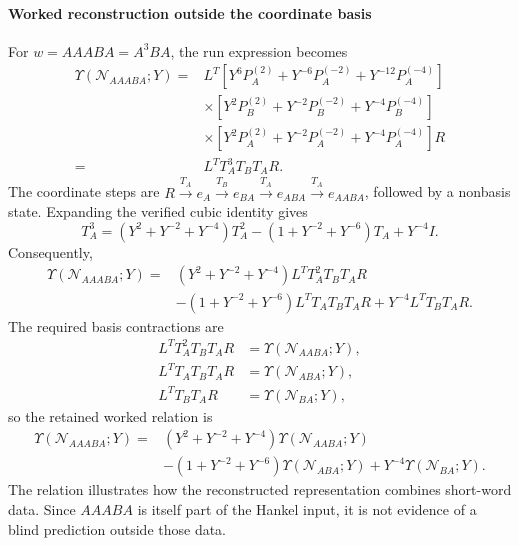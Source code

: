 \documentclass[10pt,twocolumn]{article}
\begin{document}
\paragraph{Worked reconstruction outside the coordinate basis}
\label{supp:nonabelian_worked_example}
For $w=AAABA=A^3BA$, the run expression becomes
\begin{equation}
\begin{aligned}
\Upsilon(\mathcal N_{AAABA};Y)={}&L^T\left[Y^6P_A^{(2)}+Y^{-6}P_A^{(-2)}+Y^{-12}P_A^{(-4)}\right]\\
&\times\left[Y^2P_B^{(2)}+Y^{-2}P_B^{(-2)}+Y^{-4}P_B^{(-4)}\right]\\
&\times\left[Y^2P_A^{(2)}+Y^{-2}P_A^{(-2)}+Y^{-4}P_A^{(-4)}\right]R\\
={}&L^TT_A^3T_BT_AR.
\end{aligned}
\label{supp:deriv:eq:AAABA_projector_prediction}
\end{equation}
The coordinate steps are $R\xrightarrow{T_A}e_A\xrightarrow{T_B}e_{BA}\xrightarrow{T_A}e_{ABA}\xrightarrow{T_A}e_{AABA}$, followed by a nonbasis state. Expanding the verified cubic identity gives
\begin{equation}
T_A^3=(Y^2+Y^{-2}+Y^{-4})T_A^2-(1+Y^{-2}+Y^{-6})T_A+Y^{-4}I.
\label{supp:deriv:eq:TA3_reduction}
\end{equation}
Consequently,
\begin{equation}
\begin{aligned}
\Upsilon(\mathcal N_{AAABA};Y)={}&(Y^2+Y^{-2}+Y^{-4})L^TT_A^2T_BT_AR\\
&-(1+Y^{-2}+Y^{-6})L^TT_AT_BT_AR+Y^{-4}L^TT_BT_AR.
\end{aligned}
\label{supp:deriv:eq:AAABA_reduced}
\end{equation}
The required basis contractions are
\begin{equation}
\begin{aligned}
L^TT_A^2T_BT_AR&=\Upsilon(\mathcal N_{AABA};Y),\\
L^TT_AT_BT_AR&=\Upsilon(\mathcal N_{ABA};Y),\\
L^TT_BT_AR&=\Upsilon(\mathcal N_{BA};Y),
\end{aligned}
\label{supp:deriv:eq:AAABA_basis_contractions}
\end{equation}
so the retained worked relation is
\begin{equation}
\boxed{\begin{aligned}
\Upsilon(\mathcal N_{AAABA};Y)={}&(Y^2+Y^{-2}+Y^{-4})\Upsilon(\mathcal N_{AABA};Y)\\
&-(1+Y^{-2}+Y^{-6})\Upsilon(\mathcal N_{ABA};Y)+Y^{-4}\Upsilon(\mathcal N_{BA};Y).
\end{aligned}}
\label{supp:deriv:eq:AAABA_prediction}
\end{equation}
The relation illustrates how the reconstructed representation combines short-word data. Since $AAABA$ is itself part of the Hankel input, it is not evidence of a blind prediction outside those data.
\end{document}
